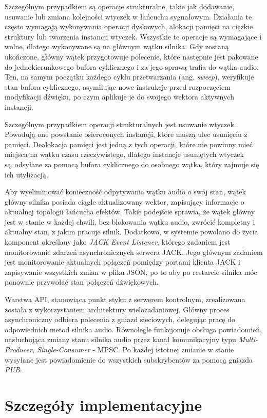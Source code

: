 \documentclass[12pt,a4paper]{report}
\begin{document}
Szczególnym przypadkiem są operacje strukturalne, takie jak
dodawanie, usuwanie lub zmiana kolejności wtyczek w łańcuchu
sygnałowym. Działania te często wymagają wykonywania operacji
dyskowych, alokacji pamięci na ciężkie struktury lub tworzenia instancji
wtyczek. Wszystkie te operacje są wymagające i wolne, dlatego
wykonywane są na głównym wątku silnika. Gdy zostaną ukończone, główny
wątek przygotowuje polecenie, które następnie jest pakowane do
jednokierunkowego bufora cyklicznego i za jego sprawą trafia do wątka
audio. Ten, na samym początku każdego cyklu przetwarzania (ang.
\textit{sweep}), weryfikuje stan bufora cyklicznego, asymilując nowe
instrukcje przed rozpoczęciem modyfikacji dźwięku, po czym aplikuje
je do swojego wektora aktywnych instancji.

Szczególnym przypadkiem operacji strukturalnych jest usuwanie
wtyczek. Powodują one powstanie osieroconych instancji, które muszą
ulec usunięciu z pamięci. Dealokacja pamięci jest jedną z tych operacji, które
nie powinny mieć miejsca na wątku czasu rzeczywistego, dlatego
instancje usuniętych
wtyczek są odsyłane za pomocą bufora cyklicznego do osobnego wątka,
który zajmuje
się ich utylizacją.

Aby wyeliminować konieczność odpytywania wątku audio o swój stan,
wątek główny silnika posiada ciągle aktualizowany wektor, zapisujący
informacje o aktualnej topologii łańcucha efektów. Takie podejście
sprawia, że wątek główny jest w stanie w każdej chwili, bez
blokowania wątku audio, zwrócić kompletny i aktualny stan, z jakim
pracuje silnik. Dodatkowo, w systemie powołano do życia komponent określany
jako \textit{JACK Event Listener}, którego zadaniem jest
monitorowanie zdarzeń asynchronicznych serwera JACK. Jego głównym
zadaniem jest monitorowanie aktualnych połączeń pomiędzy portami
klienta JACK i zapisywanie wszystkich zmian w pliku JSON, po to aby
po restarcie silnika móc ponownie przywołać stan połączeń dźwiękowych.

Warstwa API, stanowiąca punkt styku z serwerem kontrolnym,
zrealizowana została z wykorzystaniem architektury wielozadaniowej.
Główny proces asynchroniczny odbiera polecenia z gniazd sieciowych,
delegując pracę do odpowiednich metod silnika audio. Równolegle
funkcjonuje obsługa powiadomień, nasłuchująca zmiany stanu silnika
audio przez kanał komunikacyjny typu \textit{Multi-Producer,
Single-Consumer} - MPSC. Po każdej istotnej zmianie w stanie wysyłane
jest powiadomienie do wszystkich subskrybentów za pomocą gniazda \textit{PUB}.

\chapter{Szczegóły implementacyjne}
\end{document}
